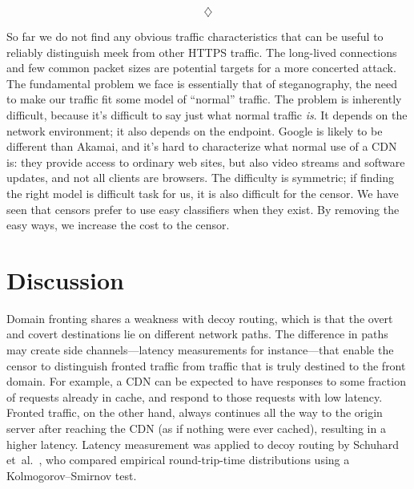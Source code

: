 \documentclass[conference]{IEEEtran}
\begin{document}
$$\diamondsuit$$

So far we do not find any obvious traffic characteristics that can be useful to reliably distinguish meek
from other HTTPS traffic.
The long-lived connections and few common packet sizes are
potential targets for a more concerted attack.
The fundamental problem we face is essentially that of steganography,
the need to make our traffic fit some model of ``normal'' traffic.
The problem is inherently difficult,
because it's difficult to say just what normal traffic \emph{is}.
It depends on the network environment;
it also depends on the endpoint.
Google is likely to be different than Akamai,
and it's hard to characterize what normal use of a CDN is:
they provide access to ordinary web sites,
but also video streams and software updates,
and not all clients are browsers.
The difficulty is symmetric;
if finding the right model is difficult task for us,
it is also difficult for the censor.
We have seen that censors prefer to use easy classifiers when they exist.
By removing the easy ways, we increase the cost to the censor.

\section{Discussion}
\label{sec:discussion}


Domain fronting shares a weakness with decoy routing,
which is that the overt and covert destinations lie on different
network paths.
The difference in paths may create side channels---latency measurements for instance---that
enable the censor to
distinguish fronted traffic from traffic that is truly destined
to the front domain.
For example, a CDN can be expected to have responses
to some fraction of requests already in cache,
and respond to those requests with low latency.
Fronted traffic, on the other hand, always continues all the way
to the origin server after reaching the CDN (as if nothing were ever cached),
resulting in a higher latency.
Latency measurement was applied to decoy routing by Schuhard et~al.~\cite[Section~5]{ccs2012-decoys},
who compared empirical round-trip-time distributions using a
Kolmogorov--Smirnov test.
\end{document}
